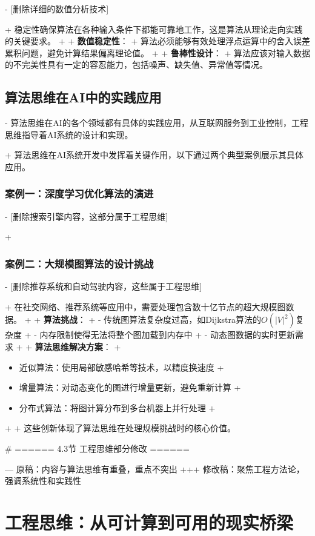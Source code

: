 - [删除详细的数值分析技术]

+ 稳定性确保算法在各种输入条件下都能可靠地工作，这是算法从理论走向实践的关键要求。
+
+ \textbf{数值稳定性}：
+ 算法必须能够有效处理浮点运算中的舍入误差累积问题，避免计算结果偏离理论值。
+
+ \textbf{鲁棒性设计}：
+ 算法应该对输入数据的不完美性具有一定的容忍能力，包括噪声、缺失值、异常值等情况。

\subsection{算法思维在AI中的实践应用}

- 算法思维在AI的各个领域都有具体的实践应用，从互联网服务到工业控制，工程思维指导着AI系统的设计和实现。

+ 算法思维在AI系统开发中发挥着关键作用，以下通过两个典型案例展示其具体应用。

\subsubsection{案例一：深度学习优化算法的演进}

- [删除搜索引擎内容，这部分属于工程思维]

+ 

\subsubsection{案例二：大规模图算法的设计挑战}

- [删除推荐系统和自动驾驶内容，这些属于工程思维]

+ 在社交网络、推荐系统等应用中，需要处理包含数十亿节点的超大规模图数据。
+
+ \textbf{算法挑战}：
+ - 传统图算法复杂度过高，如Dijkstra算法的$O(|V|^2)$复杂度
+ - 内存限制使得无法将整个图加载到内存中
+ - 动态图数据的实时更新需求
+
+ \textbf{算法思维解决方案}：
+ \begin{itemize}
+ \item 近似算法：使用局部敏感哈希等技术，以精度换速度
+ \item 增量算法：对动态变化的图进行增量更新，避免重新计算
+ \item 分布式算法：将图计算分布到多台机器上并行处理
+ \end{itemize}
+
+ 这些创新体现了算法思维在处理规模挑战时的核心价值。

# ====== 4.3节 工程思维部分修改 ======

--- 原稿：内容与算法思维有重叠，重点不突出
+++ 修改稿：聚焦工程方法论，强调系统性和实践性

\section{工程思维：从可计算到可用的现实桥梁}


